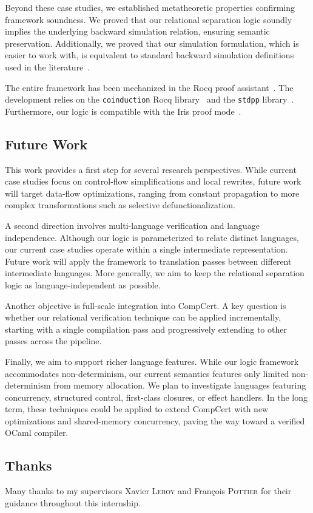 \documentclass[report.tex]{subfiles}
\begin{document}
Beyond these case studies,
we established metatheoretic properties confirming framework soundness.
We proved that our relational separation logic soundly implies
the underlying backward simulation relation,
ensuring semantic preservation.
Additionally,
we proved that our simulation formulation,
which is easier to work with,
is equivalent
to standard backward simulation definitions used in the
literature~\parencites{leroy-09-compcert,gaher-22-simuliris,allain-25-tmc}.

The entire framework has been mechanized
in the Rocq proof assistant~\parencite{rocq}.
The development relies on the \texttt{coinduction} Rocq
library~\parencite{rocq-coinduction}
and the \texttt{stdpp} library~\parencite{rocq-stdpp}.
Furthermore,
our logic is compatible with the Iris proof mode~\parencite{krebbers-18-mosel}.

\subsection*{Future Work}

This work provides a first step for several research perspectives.
While current case studies focus on control-flow simplifications
and local rewrites,
future work will target data-flow optimizations,
ranging from constant propagation
to more complex transformations such as selective defunctionalization.

A second direction involves multi-language verification
and language independence.
Although our logic is parameterized to relate distinct languages,
our current case studies operate within a single intermediate representation.
Future work will apply the framework to translation passes
between different intermediate languages.
More generally,
we aim to keep the relational separation logic as language-independent as
possible.

Another objective is full-scale integration into CompCert.
A key question is whether our relational verification technique can be
applied incrementally,
starting with a single compilation pass
and progressively extending to other passes across the pipeline.

Finally,
we aim to support richer language features.
While our logic framework accommodates non-determinism,
our current \muRTL{} semantics features only limited non-determinism
from memory allocation.
We plan to investigate languages featuring concurrency,
structured control,
first-class closures,
or effect handlers.
In the long term,
these techniques could be applied to extend CompCert with new optimizations
and shared-memory concurrency,
paving the way toward a verified OCaml compiler.

\subsection*{Thanks}
Many thanks to my supervisors Xavier \textsc{Leroy} and François \textsc{Pottier}
for their guidance throughout this internship.
\end{document}
